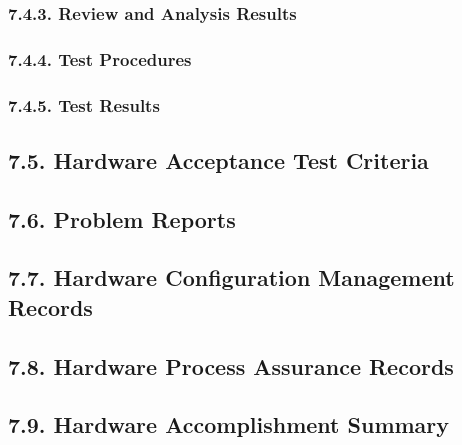 \documentclass[
]{article}
\begin{document}
\hypertarget{review-and-analysis-results}{%
\subsubsection{7.4.3. Review and Analysis
Results}\label{review-and-analysis-results}}

\hypertarget{test-procedures}{%
\subsubsection{7.4.4. Test Procedures}\label{test-procedures}}

\hypertarget{test-results}{%
\subsubsection{7.4.5. Test Results}\label{test-results}}

\hypertarget{hardware-acceptance-test-criteria}{%
\subsection{7.5. Hardware Acceptance Test
Criteria}\label{hardware-acceptance-test-criteria}}

\hypertarget{problem-reports}{%
\subsection{7.6. Problem Reports}\label{problem-reports}}

\hypertarget{hardware-configuration-management-records}{%
\subsection{7.7. Hardware Configuration Management
Records}\label{hardware-configuration-management-records}}

\hypertarget{hardware-process-assurance-records}{%
\subsection{7.8. Hardware Process Assurance
Records}\label{hardware-process-assurance-records}}

\hypertarget{hardware-accomplishment-summary}{%
\subsection{7.9. Hardware Accomplishment
Summary}\label{hardware-accomplishment-summary}}
\end{document}
